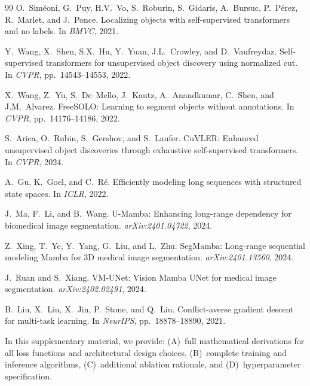 \documentclass[10pt,twocolumn,letterpaper]{article}
\begin{document}
{\begin{thebibliography}{99}
O.~Sim{\'e}oni, G.~Puy, H.V.~Vo, S.~Roburin, S.~Gidaris, A.~Bursuc, P.~P{\'e}rez, R.~Marlet, and J.~Ponce.
Localizing objects with self-supervised transformers and no labels.
In \emph{BMVC}, 2021.

Y.~Wang, X.~Shen, S.X.~Hu, Y.~Yuan, J.L.~Crowley, and D.~Vaufreydaz.
Self-supervised transformers for unsupervised object discovery using normalized cut.
In \emph{CVPR}, pp.~14543--14553, 2022.

X.~Wang, Z.~Yu, S.~De~Mello, J.~Kautz, A.~Anandkumar, C.~Shen, and J.M.~Alvarez.
{FreeSOLO}: Learning to segment objects without annotations.
In \emph{CVPR}, pp.~14176--14186, 2022.

S.~Arica, O.~Rubin, S.~Gershov, and S.~Laufer.
{CuVLER}: Enhanced unsupervised object discoveries through exhaustive self-supervised transformers.
In \emph{CVPR}, 2024.

A.~Gu, K.~Goel, and C.~R{\'e}.
Efficiently modeling long sequences with structured state spaces.
In \emph{ICLR}, 2022.

J.~Ma, F.~Li, and B.~Wang.
{U-Mamba}: Enhancing long-range dependency for biomedical image segmentation.
\emph{arXiv:2401.04722}, 2024.

Z.~Xing, T.~Ye, Y.~Yang, G.~Liu, and L.~Zhu.
{SegMamba}: Long-range sequential modeling {M}amba for {3D} medical image segmentation.
\emph{arXiv:2401.13560}, 2024.

J.~Ruan and S.~Xiang.
{VM-UNet}: Vision {M}amba {UN}et for medical image segmentation.
\emph{arXiv:2402.02491}, 2024.

B.~Liu, X.~Liu, X.~Jin, P.~Stone, and Q.~Liu.
Conflict-averse gradient descent for multi-task learning.
In \emph{NeurIPS}, pp.~18878--18890, 2021.

\end{thebibliography}
}


\maketitlesupplementary

In this supplementary material, we provide: (A)~full mathematical derivations for all loss functions and architectural design choices, (B)~complete training and inference algorithms, (C)~additional ablation rationale, and (D)~hyperparameter specification.
\end{document}
